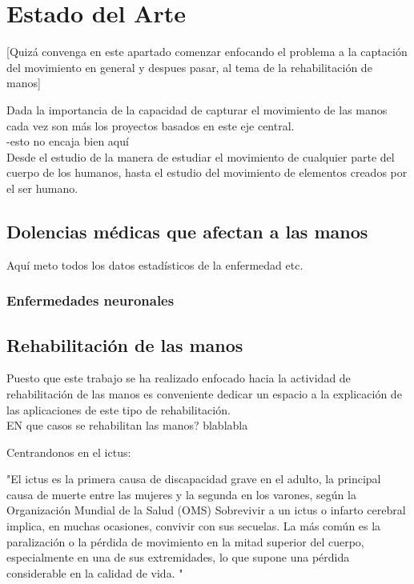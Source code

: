 \chapter{Estado del Arte\label{sec:estado_del_arte}}

[Quizá convenga en este apartado comenzar enfocando el problema a la captación del movimiento en general y despues pasar, al tema de la rehabilitación de manos]

Dada la importancia de la capacidad de capturar el movimiento de las manos cada vez son más los proyectos basados en este eje central.\\
-esto no encaja bien aquí  \\
Desde el estudio de la manera de estudiar el movimiento de cualquier parte del cuerpo de los humanos, hasta el estudio del movimiento de elementos creados por el ser humano. \\ %

\section{Dolencias médicas que afectan a las manos}
\label{sec:dolencias2}

Aquí meto todos los datos estadísticos de la enfermedad etc.

\subsection{Enfermedades neuronales}
\label{sec:neuronal2}




\section{Rehabilitación de las manos}
\label{sec:Rehabilitacion2}
Puesto que este trabajo se ha realizado enfocado hacia la actividad de rehabilitación de las manos es conveniente dedicar un espacio a la explicación de las aplicaciones de este tipo de rehabilitación.\\


EN que casos se rehabilitan las manos? 
blablabla

Centrandonos en el ictus:

"El ictus es la primera causa de discapacidad grave en el adulto, la principal causa de muerte entre las mujeres y la segunda en los varones, según la Organización Mundial de la Salud (OMS) Sobrevivir a un ictus o infarto cerebral implica, en muchas ocasiones, convivir con sus secuelas. La más común es la paralización o la pérdida de movimiento en la mitad superior del cuerpo, especialmente en una de sus extremidades, lo que supone una pérdida considerable en la calidad de vida. "


